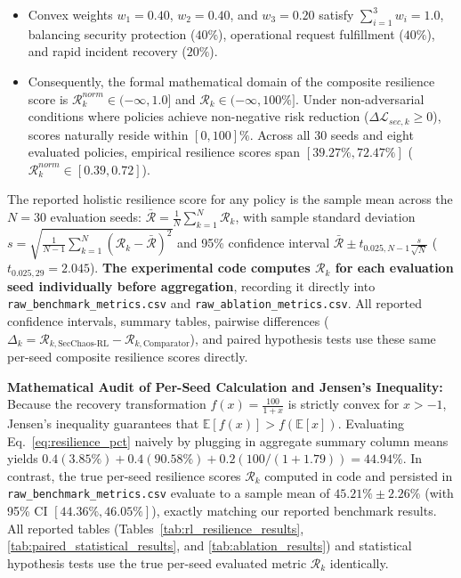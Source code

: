 \documentclass[ASNA,twocolumn]{USG}
\begin{document}
\begin{enumerate}
\begin{itemize}
        \item Convex weights $w_1 = 0.40$, $w_2 = 0.40$, and $w_3 = 0.20$ satisfy $\sum_{i=1}^3 w_i = 1.0$, balancing security protection ($40\%$), operational request fulfillment ($40\%$), and rapid incident recovery ($20\%$).
        \item Consequently, the formal mathematical domain of the composite resilience score is $\mathcal{R}_k^{norm} \in (-\infty, 1.0]$ and $\mathcal{R}_k \in (-\infty, 100\%]$. Under non-adversarial conditions where policies achieve non-negative risk reduction ($\Delta \mathcal{L}_{sec, k} \ge 0$), scores naturally reside within $[0, 100]\%$. Across all 30 seeds and eight evaluated policies, empirical resilience scores span $[39.27\%, 72.47\%]$ ($\mathcal{R}_k^{norm} \in [0.39, 0.72]$).
    \end{itemize}
    The reported holistic resilience score for any policy is the sample mean across the $N=30$ evaluation seeds: $\bar{\mathcal{R}} = \frac{1}{N}\sum_{k=1}^N \mathcal{R}_k$, with sample standard deviation $s = \sqrt{\frac{1}{N-1}\sum_{k=1}^N (\mathcal{R}_k - \bar{\mathcal{R}})^2}$ and 95\% confidence interval $\bar{\mathcal{R}} \pm t_{0.025, N-1} \frac{s}{\sqrt{N}}$ ($t_{0.025, 29} = 2.045$). \textbf{The experimental code computes $\mathcal{R}_k$ for each evaluation seed individually before aggregation}, recording it directly into \texttt{raw\_benchmark\_metrics.csv} and \texttt{raw\_ablation\_metrics.csv}. All reported confidence intervals, summary tables, pairwise differences ($\Delta_k = \mathcal{R}_{k, \text{SecChaos-RL}} - \mathcal{R}_{k, \text{Comparator}}$), and paired hypothesis tests use these same per-seed composite resilience scores directly.
    
    \textbf{Mathematical Audit of Per-Seed Calculation and Jensen's Inequality:} Because the recovery transformation $f(x) = \frac{100}{1+x}$ is strictly convex for $x > -1$, Jensen's inequality guarantees that $\mathbb{E}[f(x)] > f(\mathbb{E}[x])$. Evaluating Eq.~\eqref{eq:resilience_pct} naively by plugging in aggregate summary column means yields $0.4(3.85\%) + 0.4(90.58\%) + 0.2(100 / (1 + 1.79)) = 44.94\%$. In contrast, the true per-seed resilience scores $\mathcal{R}_k$ computed in code and persisted in \texttt{raw\_benchmark\_metrics.csv} evaluate to a sample mean of $\mathbf{45.21\% \pm 2.26\%}$ (with 95\% CI $[44.36\%, 46.05\%]$), exactly matching our reported benchmark results. All reported tables (Tables~\ref{tab:rl_resilience_results}, \ref{tab:paired_statistical_results}, and \ref{tab:ablation_results}) and statistical hypothesis tests use the true per-seed evaluated metric $\mathcal{R}_k$ identically.
\end{enumerate}
\end{document}
